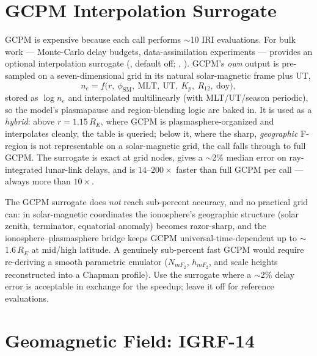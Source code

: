 \section{GCPM Interpolation Surrogate}
\label{sec:iono-gcpm-surrogate}

GCPM is expensive because each call
performs $\sim$10 IRI evaluations.  For bulk work --- Monte-Carlo delay budgets,
data-assimilation experiments --- \lupnt{} provides an optional interpolation
surrogate (, default off;
, ).  GCPM's \emph{own}
output is pre-sampled on a seven-dimensional grid in its natural solar-magnetic
frame plus UT,
%
\begin{equation}
  \label{eq:iono-gcpm-surrogate}
  n_e = f\big(r,\ \phi_\mathrm{SM},\ \mathrm{MLT},\ \mathrm{UT},\ K_p,\ R_{12},\ \mathrm{doy}\big),
\end{equation}
%
stored as $\log n_e$ and interpolated multilinearly (with MLT/UT/season periodic),
so the model's plasmapause and region-blending logic are baked in.  It is used as a
\emph{hybrid}: above $r = 1.15\,R_E$, where GCPM is plasmasphere-organized and
interpolates cleanly, the table is queried; below it, where the sharp,
\emph{geographic} F-region is not representable on a solar-magnetic grid, the call
falls through to full GCPM.  The surrogate is
exact at grid nodes, gives a $\sim$2\% median error on ray-integrated lunar-link
delays, and is $14$--$200\times$ faster than full GCPM per call --- always more
than $10\times$.

\begin{lupntwarning}
The GCPM surrogate does \emph{not} reach sub-percent accuracy, and no practical
grid can: in solar-magnetic coordinates the ionosphere's geographic structure
(solar zenith, terminator, equatorial anomaly) becomes razor-sharp, and the
ionosphere--plasmasphere bridge keeps GCPM universal-time-dependent up to
$\sim$1.6\,$R_E$ at mid/high latitude.  A genuinely sub-percent fast GCPM would
require re-deriving a smooth parametric emulator ($N_{mF_2}$, $h_{mF_2}$, and scale
heights reconstructed into a Chapman profile).  Use the surrogate where a $\sim$2\% delay error
is acceptable in exchange for the speedup; leave it off for reference evaluations.
\end{lupntwarning}

\section{Geomagnetic Field: IGRF-14}
\label{sec:iono-igrf}


